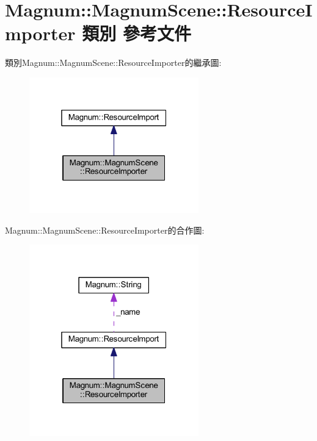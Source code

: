 \hypertarget{class_magnum_1_1_magnum_scene_1_1_resource_importer}{}\section{Magnum\+:\+:Magnum\+Scene\+:\+:Resource\+Importer 類別 參考文件}
\label{class_magnum_1_1_magnum_scene_1_1_resource_importer}


類別\+Magnum\+:\+:Magnum\+Scene\+:\+:Resource\+Importer的繼承圖\+:\nopagebreak
\begin{figure}[H]
\begin{center}
\leavevmode
\includegraphics[width=208pt]{class_magnum_1_1_magnum_scene_1_1_resource_importer__inherit__graph}
\end{center}
\end{figure}


Magnum\+:\+:Magnum\+Scene\+:\+:Resource\+Importer的合作圖\+:\nopagebreak
\begin{figure}[H]
\begin{center}
\leavevmode
\includegraphics[width=208pt]{class_magnum_1_1_magnum_scene_1_1_resource_importer__coll__graph}
\end{center}
\end{figure}
